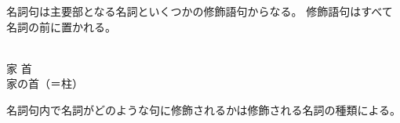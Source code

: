 名詞句は主要部となる名詞といくつかの修飾語句からなる。
修飾語句はすべて名詞の前に置かれる。

\begin{exe}
    \ex \gll [p\'oia] [v\'ir\'o] \\
        家 首 \\
    \glt 家の首（＝柱）
\end{exe}

名詞句内で名詞がどのような句に修飾されるかは修飾される名詞の種類による。